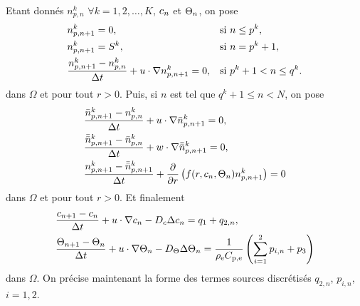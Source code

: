Etant donnés $n_{p,n}^k$ $\forall k=1, 2, \dots, K$,
$c_n$ et $\Theta_n$, on pose
\begin{align}
  & n_{p,n+1}^k = 0, &&\text{si } n \leq p^k,\\
  & n_{p,n+1}^k = S^k, &&\text{si } n = p^k + 1,\\
  & \frac{n_{p,n+1}^k - n_{p,n}^k}{\Delta t} + u\cdot\nabla n_{p,n+1}^k = 0, && \text{si } p^k + 1 < n \leq q^k.\label{eq:splitting-np1-u}
\end{align}
dans $\Omega$ et pour tout $r > 0$. Puis, si $n$ est tel que $q^k + 1 \leq n < N$, on pose
\begin{align}
  &\displaystyle\frac{\bar n_{p,n+1}^k - n_{p,n}^k}{\Delta t} +
  u\cdot\nabla \bar n_{p,n+1}^k = 0,\label{eq:splitting-np2-u}\\
  &\displaystyle\frac{\bar{\bar n}_{p,n+1}^k - \bar n_{p,n}^k}{\Delta t} +
  w\cdot\nabla \bar{\bar n}_{p,n+1}^k = 0,\label{eq:splitting-np2-w}\\
    &\displaystyle\frac{n_{p,n+1}^k - \bar{\bar n}_{p,n+1}^k}{\Delta t} +
    \displaystyle\frac{\partial}{\partial r}\left( f(r,
      c_n, \Theta_n)n_{p,n+1}^k \right) =
    0\label{eq:splitting-dissolution}
\end{align}
dans $\Omega$ et pour tout $r > 0$. Et finalement
\begin{align}
&\frac{c_{n+1} - c_{n}}{\Delta t} + u\cdot\nabla
c_n - D_c \Delta c_n = q_1
+ q_{2,n},\label{eq:splitting-c} \\
&\frac{\Theta_{n+1} - \Theta_{n}}{\Delta t} + u\cdot\nabla
\Theta_n - D_\Theta \Delta \Theta_n =
\frac{1}{\rho_\mathrm{e} C_{\mathrm{p,e}}}\left( \sum_{i =
    1}^2p_{i,n} + p_3 \right)\label{eq:splitting-t}
\end{align}
dans $\Omega$. On précise maintenant la forme des termes sources
discrétisés $q_{2,n}$, $p_{i,n}$, $i = 1,2$.

